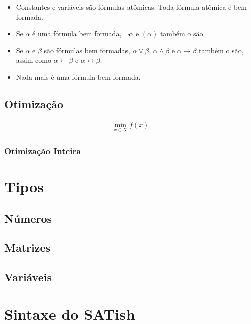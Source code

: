 \documentclass[12pt]{satyrus}
\begin{document}
   	\begin{itemize}
   		\item Constantes e variáveis são fórmulas atômicas. Toda fórmula atômica é bem formada.
   		
   		\item Se $\alpha$ é uma fórmula bem formada, $\neg \alpha$ e $(\alpha)$ também o são.
   		
   		\item Se $\alpha$ e $\beta$ são fórmulas bem formadas, $\alpha \vee \beta$, $\alpha \wedge \beta$ e $\alpha \rightarrow \beta$ também o são, assim como $\alpha \leftarrow \beta$ e $\alpha \leftrightarrow \beta$.
   		
   		\item Nada mais é uma fórmula bem formada.
   	\end{itemize}
   
	\section{Otimização}
	
	
	\begin{align*}
	\min_{x \in X} f(x)
	\end{align*}
	
	\subsection{Otimização Inteira}
	
    
    \chapter{Tipos}
    
    \section{Números}
    
    \section{Matrizes}
    
    \section{Variáveis}
    
    \chapter{Sintaxe do SATish}
    
\end{document}
